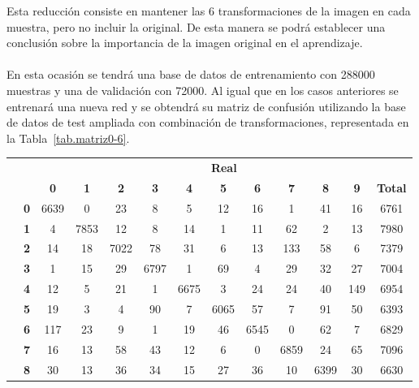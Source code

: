 \begin{description}
	Esta reducción consiste en mantener las 6 transformaciones de la imagen en cada muestra, pero no incluir la original. De esta manera se podrá establecer una conclusión sobre la importancia de la imagen original en el aprendizaje.\\
	\vspace{-10pt}
	\\
	En esta ocasión se tendrá una base de datos de entrenamiento con 288000 muestras y una de validación con 72000. Al igual que en los casos anteriores se entrenará una nueva red y se obtendrá su matriz de confusión utilizando la base de datos de test ampliada con combinación de transformaciones, representada en la Tabla~\ref{tab.matriz0-6}.
	\begin{table}[H]
		\centering
		\begin{tabular}{|c|l|c|c|c|c|c|c|c|c|c|c|c|}
			\cline{3-13} 
			\multicolumn{2}{c|}{} & \multicolumn{11}{c|}{\textbf{Real}} \\ \cline{3-13} 
			\multicolumn{2}{c|}{} & \textbf{0} & \textbf{1} & \textbf{2} &  \textbf{3} & \textbf{4} & \textbf{5} & \textbf{6} & \textbf{7} & \textbf{8} & \textbf{9} & \textbf{Total}\\ \hline
			\multirow{10}{0.5cm}{\rotatebox{90}{\textbf{Predicción}}}& \textbf{0} & \cellcolor{lightgray}6639 & 0 & 23 & 8 & 5 & 12 & 16 & 1 & 41 & 16 & 6761\\ \cline{2-13}
			& \textbf{1} & 4 & \cellcolor{lightgray}7853 & 12 & 8 & 14 & 1 & 11 & 62 & 2 & 13 & 7980\\ \cline{2-13}
			& \textbf{2} & 14 & 18 & \cellcolor{lightgray}7022 & 78 & 31 & 6 & 13 & 133 & 58 & 6 & 7379\\ \cline{2-13}
			& \textbf{3} & 1 & 15 & 29 & \cellcolor{lightgray}6797 & 1 & 69 & 4 & 29 & 32 & 27 & 7004\\ \cline{2-13}
			& \textbf{4} & 12 & 5 & 21 & 1 & \cellcolor{lightgray}6675 & 3 & 24 & 24 & 40 & 149 & 6954\\ \cline{2-13}
			& \textbf{5} & 19 & 3 & 4 & 90 & 7 & \cellcolor{lightgray}6065 & 57 & 7 & 91 & 50 & 6393\\ \cline{2-13}
			& \textbf{6} & 117 & 23 & 9 & 1 & 19 & 46 & \cellcolor{lightgray}6545 & 0 & 62 & 7 & 6829\\ \cline{2-13}
			& \textbf{7} & 16 & 13 & 58 & 43 & 12 & 6 & 0 & \cellcolor{lightgray}6859 & 24 & 65 & 7096\\ \cline{2-13}
			& \textbf{8} & 30 & 13 & 36 & 34 & 15 & 27 & 36 & 10 & \cellcolor{lightgray}6399 & 30 & 6630\\ \cline{2-13}

\end{tabular}
\end{table}
\end{description}
